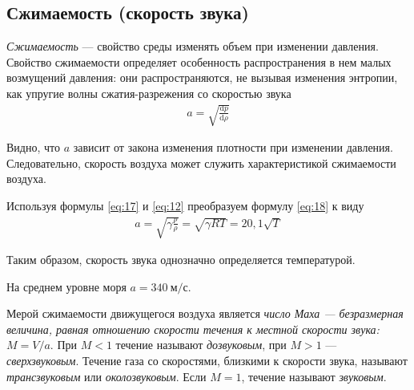 	\subsection{Сжимаемость (скорость звука)}
	\textit{Сжимаемость} --- свойство среды изменять объем при изменении давления. Свойство сжимаемости определяет особенность распространения в нем малых возмущений давления: они распространяются, не вызывая изменения энтропии, как упругие волны сжатия-разрежения со скоростью звука
	\begin{gather}
		a=\sqrt{\frac{\mathrm{d}p}{\mathrm{d}\rho}}\label{eq:18}
	\end{gather}\par
	Видно, что $a$ зависит от закона изменения плотности при изменении давления. Следовательно, скорость воздуха может служить характеристикой сжимаемости воздуха.\par
	Используя формулы \eqref{eq:17} и \eqref{eq:12} преобразуем формулу \eqref{eq:18} к виду
	\begin{gather}
		a=\sqrt{\gamma\frac{p}{\rho}}=\sqrt{\gamma R T}=20,1\sqrt{T}\label{eq:19}
	\end{gather}\par
	Таким образом, скорость звука однозначно определяется температурой.\par
	На среднем уровне моря $a=340\:\text{м/с}$.\par
	Мерой сжимаемости движущегося воздуха является \textit{число Маха --- безразмерная величина, равная отношению скорости течения к местной скорости звука:} $M=V/a$. При $M<1$ течение называют \textit{дозвуковым}, при $M>1$ --- \textit{сверхзвуковым}. Течение газа со скоростями, близкими к скорости звука, называют \textit{трансзвуковым} или \textit{околозвуковым}. Если $M=1$, течение называют \textit{звуковым}.
	
